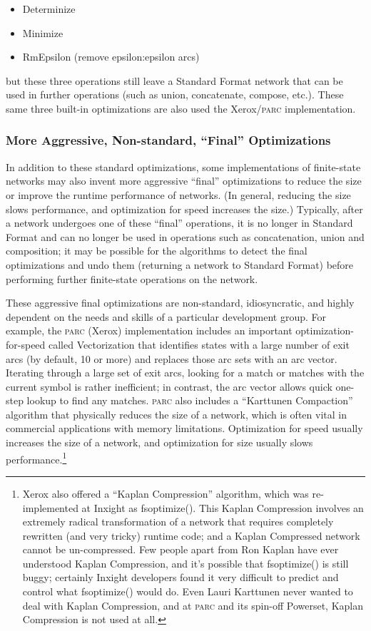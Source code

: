 \documentclass[letterpaper,12pt]{article}
\providecommand{\acro}{}\renewcommand{\acro}{\textsc}
\begin{document}
\begin{itemize}
\item
Determinize
\item
Minimize
\item
RmEpsilon (remove epsilon:epsilon arcs)
\end{itemize}

\noindent
but these three operations still leave a Standard Format network that can be used in further operations
(such as union, concatenate, compose, etc.).  These same three
built-in optimizations are also used the Xerox/\acro{parc}
implementation.

\subsubsection{More Aggressive, Non-standard, ``Final''
Optimizations}

In addition to these standard optimizations, some implementations of
finite-state networks may also invent
more aggressive ``final'' optimizations to reduce the size or improve the runtime performance of
networks.  (In general, reducing the size slows performance, and optimization for speed increases the size.)
Typically, after a network undergoes one of these ``final'' operations, it is no longer in
Standard Format and can no longer be used in operations such as concatenation, union and composition;
it may be possible for the algorithms to detect the final optimizations and undo them (returning a
network to Standard Format) before performing further finite-state operations on the network.

These aggressive final optimizations are non-standard,
idiosyncratic, and highly dependent on the needs and skills of a
particular development group.
For example, the \acro{parc} (Xerox) implementation includes an
important optimization-for-speed called Vectorization that identifies states with
a large number of exit arcs (by default, 10 or more) and replaces those arc sets with an arc vector.
Iterating through a large set of exit arcs, looking for a match or matches with the current symbol is
rather inefficient; in contrast, the arc vector allows quick one-step lookup to find any matches.  \acro{parc} also
includes a ``Karttunen Compaction'' algorithm that physically reduces the size of a network, which is
often vital in commercial applications with memory limitations.  Optimization for speed usually
increases the size of a network, and optimization for size usually slows performance.\footnote{Xerox
also offered a ``Kaplan Compression'' algorithm, which was re-implemented
at Inxight as fsoptimize().  This
Kaplan Compression involves an extremely radical transformation of a network that requires completely
rewritten (and very tricky) runtime code; and a Kaplan Compressed network cannot be un-compressed.  Few
people apart from Ron Kaplan have ever understood Kaplan Compression, and
it's possible that fsoptimize() is
still buggy; certainly Inxight developers found it very difficult to
predict and control what fsoptimize()
would do.  Even Lauri Karttunen never wanted to deal with Kaplan Compression, and at \acro{parc} and
its spin-off Powerset, Kaplan Compression is not used at all.}
\end{document}
